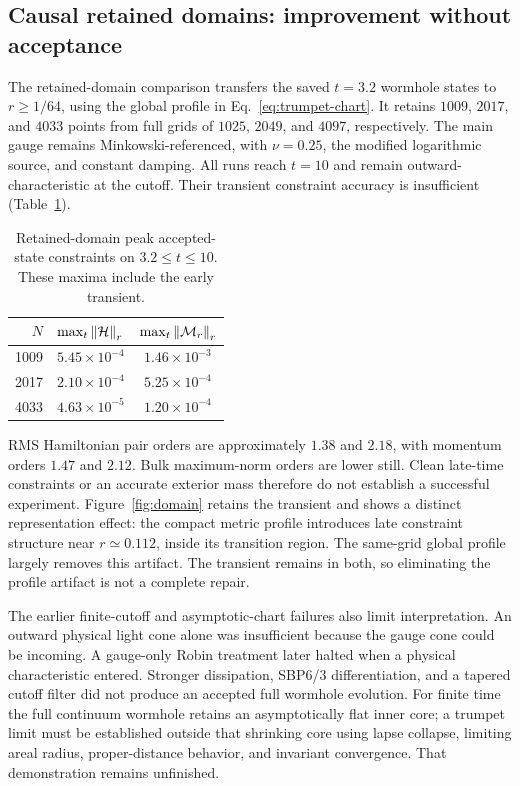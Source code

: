 \subsection{Causal retained domains: improvement without acceptance}
The retained-domain comparison transfers the saved $t=3.2$ wormhole states to $r\geq1/64$, using the global profile in Eq.~\eqref{eq:trumpet-chart}. It retains $1009$, $2017$, and $4033$ points from full grids of $1025$, $2049$, and $4097$, respectively. The main gauge remains Minkowski-referenced, with $\nu=0.25$, the modified logarithmic source, and constant damping. All runs reach $t=10$ and remain outward-characteristic at the cutoff. Their transient constraint accuracy is insufficient (Table~\ref{tab:domain}).

\begin{table}[tbp]
\caption{Retained-domain peak accepted-state constraints on $3.2\leq t\leq10$. These maxima include the early transient.}
\label{tab:domain}
\begin{ruledtabular}
\begin{tabular}{rcc}
$N$ & $\max_t\left\|\mathcal H\right\|_r$ & $\max_t\left\|\mathcal M_r\right\|_r$\\
\hline
1009 & $5.45\times10^{-4}$ & $1.46\times10^{-3}$\\
2017 & $2.10\times10^{-4}$ & $5.25\times10^{-4}$\\
4033 & $4.63\times10^{-5}$ & $1.20\times10^{-4}$
\end{tabular}
\end{ruledtabular}
\end{table}

RMS Hamiltonian pair orders are approximately $1.38$ and $2.18$, with momentum orders $1.47$ and $2.12$. Bulk maximum-norm orders are lower still. Clean late-time constraints or an accurate exterior mass therefore do not establish a successful experiment. Figure~\ref{fig:domain} retains the transient and shows a distinct representation effect: the compact metric profile introduces late constraint structure near $r\simeq0.112$, inside its transition region. The same-grid global profile largely removes this artifact. The transient remains in both, so eliminating the profile artifact is not a complete repair.

The earlier finite-cutoff and asymptotic-chart failures also limit interpretation. An outward physical light cone alone was insufficient because the gauge cone could be incoming. A gauge-only Robin treatment later halted when a physical characteristic entered. Stronger dissipation, SBP6/3 differentiation, and a tapered cutoff filter did not produce an accepted full wormhole evolution. For finite time the full continuum wormhole retains an asymptotically flat inner core; a trumpet limit must be established outside that shrinking core using lapse collapse, limiting areal radius, proper-distance behavior, and invariant convergence. That demonstration remains unfinished.

